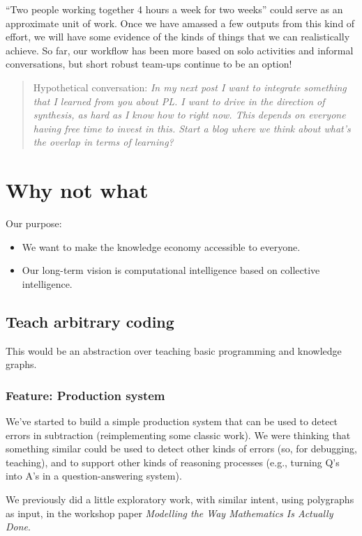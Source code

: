 \documentclass[11pt]{article}
\begin{document}
“Two people working together 4 hours a week for two weeks” could serve
as an approximate unit of work.  Once we have amassed a few outputs
from this kind of effort, we will have some evidence of the kinds of
things that we can realistically achieve.  So far, our workflow has
been more based on solo activities and informal conversations, but
short robust team-ups continue to be an option!

\begin{quote}
Hypothetical conversation: \emph{In my next post I want to integrate something that I learned from you about PL.  I want to drive in the direction of synthesis, as hard as I know how to right now.  This depends on everyone having free time to invest in this.  Start a blog where we think about what's the overlap in terms of learning?}
\end{quote}
\section{Why not what}
\label{sec:org2ebea07}
Our purpose:

\begin{itemize}
\item We want to make the knowledge economy accessible to everyone.
\item Our long-term vision is computational intelligence based on collective intelligence.
\end{itemize}
\subsection{Teach arbitrary coding}
\label{sec:org3fd6966}
This would be an abstraction over teaching basic programming and
knowledge graphs.

\subsubsection{Feature: Production system}
\label{sec:org27f51e2}

We’ve started to build a simple production system that can be used to
detect errors in subtraction (reimplementing some classic work). We
were thinking that something similar could be used to detect other
kinds of errors (so, for debugging, teaching), and to support other
kinds of reasoning processes (e.g., turning Q’s into A’s in a
question-answering system).

We previously did a little exploratory work, with similar intent, using
polygraphs as input, in the workshop paper
\emph{Modelling the Way Mathematics Is Actually Done}.
\end{document}

